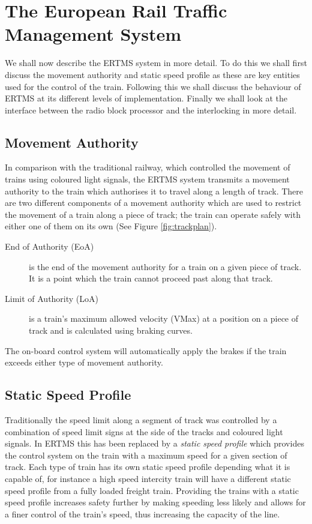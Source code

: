 \section{The European Rail Traffic Management System}
We shall now describe the ERTMS system in more detail. To do this we shall first discuss the movement authority and static speed profile as these are key entities used for the control of the train. Following this we shall discuss the behaviour of ERTMS at its different levels of implementation. Finally we shall look at the interface between the radio block processor and the interlocking in more detail.

\subsection*{Movement Authority}
In comparison with the traditional railway, which controlled the movement of trains using coloured light signals, the ERTMS system transmits a movement authority to the train which authorises it to travel along a length of track. There are two different components of a movement authority which are used to restrict the movement of a train along a piece of track; the train can operate safely with either one of them on its own (See Figure \ref{fig:trackplan}).
\begin{description}

\item[End of Authority (EoA)] is the end of the movement authority for a train on a given piece of track. It is a point which the train cannot proceed past along that track.

\item[Limit of Authority (LoA)]
 is a train's maximum allowed velocity (VMax) at a position on a piece of track and is calculated using braking curves.

\end{description}

The on-board control system will automatically apply the brakes if the train exceeds either type of movement authority.


\subsection*{Static Speed Profile}
Traditionally the speed limit along a segment of track was controlled by a combination of speed limit signs at the side of the tracks and coloured light signals. In ERTMS this has been replaced by a \emph{static speed profile} which provides the control system on the train with a maximum speed for a given section of track. Each type of train has its own static speed profile depending what it is capable of, for instance a high speed intercity train will have a different static speed profile from a fully loaded freight train. Providing the trains with a static speed profile increases safety further by making speeding less likely and allows for a finer control of the train's speed, thus increasing the capacity of the line.




